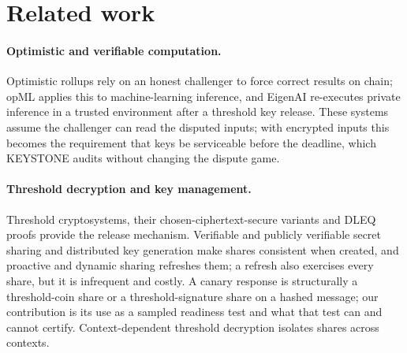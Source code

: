 \documentclass[Crown,sagev]{sagej}
\theoremstyle{plain}
\theoremstyle{definition}
\theoremstyle{remark}
\begin{document}
\section{Related work}\label{sec:related}

\paragraph{Optimistic and verifiable computation.} Optimistic rollups rely on an honest challenger to force correct results on chain\cite{kalodner2018arbitrum}; opML applies this to machine-learning inference\cite{conway2024opml}, and EigenAI re-executes private inference in a trusted environment after a threshold key release\cite{eigenai2026}. These systems assume the challenger can read the disputed inputs; with encrypted inputs this becomes the requirement that keys be serviceable before the deadline, which KEYSTONE audits without changing the dispute game.

\paragraph{Threshold decryption and key management.} Threshold cryptosystems\cite{desmedt1990threshold}, their chosen-ciphertext-secure variants\cite{shoup2002securing} and DLEQ proofs\cite{chaum1992dleq,fiat1987prove} provide the release mechanism. Verifiable and publicly verifiable secret sharing and distributed key generation\cite{feldman1987vss,schoenmakers1999pvss,gennaro2007dkg,das2022adkg} make shares consistent when created, and proactive and dynamic sharing refreshes them\cite{herzberg1995proactive,yurek2023dpss,maram2019churp}; a refresh also exercises every share, but it is infrequent and costly. A canary response is structurally a threshold-coin share\cite{cachin2005constantinople} or a threshold-signature share on a hashed message\cite{boldyreva2003threshold}; our contribution is its use as a sampled readiness test and what that test can and cannot certify. Context-dependent threshold decryption isolates shares across contexts\cite{boneh2025context}.
\end{document}

